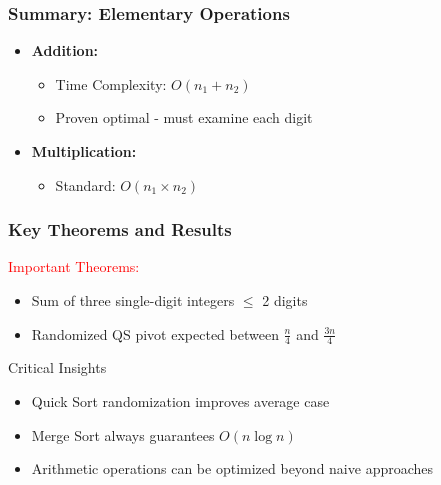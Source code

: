 \begin{frame}
    \frametitle{Summary: Elementary Operations}
    \begin{itemize}
        \item \textbf{Addition:}
        \begin{itemize}
            \item Time Complexity: $O(n_1 + n_2)$
            \item Proven optimal - must examine each digit
        \end{itemize}
        \vspace{0.3cm}
        \item \textbf{Multiplication:}
        \begin{itemize}
            \item Standard: $O(n_1 \times n_2)$            
        \end{itemize}
    \end{itemize}
\end{frame}

\begin{frame}
    \frametitle{Key Theorems and Results}
    \begin{block}{\textcolor{red}{Important Theorems:}}
        \begin{itemize}
            \item Sum of three single-digit integers $\leq$ 2 digits
            \item Randomized QS pivot expected between $\frac{n}{4}$ and $\frac{3n}{4}$
        \end{itemize}
    \end{block}
    
    \begin{alertblock}{Critical Insights}
        \begin{itemize}
            \item Quick Sort randomization improves average case
            \item Merge Sort always guarantees $O(n \log n)$
            \item Arithmetic operations can be optimized beyond naive approaches
        \end{itemize}
    \end{alertblock}
\end{frame}

